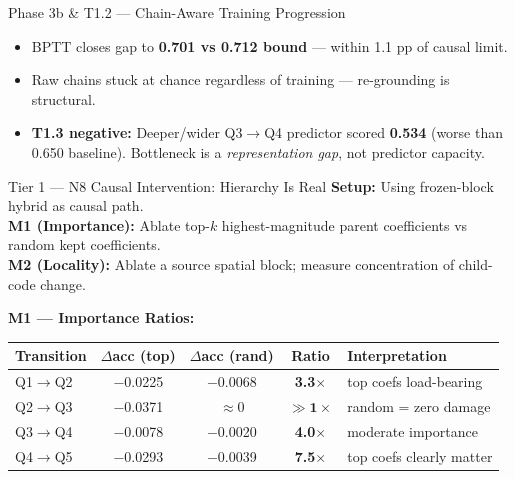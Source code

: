 \documentclass[final]{beamer}
\newlength{\colwidth}
\begin{document}
\begin{frame}[t]
\begin{columns}[t]
\begin{column}{\colwidth}
\begin{block}{Phase 3b \& T1.2 --- Chain-Aware Training Progression}
\begin{itemize}[leftmargin=1.5em, itemsep=1pt]
  \item BPTT closes gap to \textbf{0.701 vs 0.712 bound} --- within 1.1 pp of causal limit.
  \item Raw chains stuck at chance regardless of training --- re-grounding is structural.
  \item \textbf{T1.3 negative:} Deeper/wider Q3$\to$Q4 predictor scored \textbf{0.534} (worse than 0.650 baseline). Bottleneck is a \emph{representation gap}, not predictor capacity.
\end{itemize}
\end{block}

\vspace{0.5em}

\begin{block}{Tier 1 --- N8 Causal Intervention: Hierarchy Is Real}
\small
\textbf{Setup:} Using frozen-block hybrid as causal path.\\
\textbf{M1 (Importance):} Ablate top-$k$ highest-magnitude parent coefficients vs random kept coefficients.\\
\textbf{M2 (Locality):} Ablate a source spatial block; measure concentration of child-code change.

\vspace{0.4em}
\textbf{M1 --- Importance Ratios:}
\begin{center}
\begin{tabular}{@{}lcccl@{}}
\toprule
\textbf{Transition} & \textbf{$\Delta$acc (top)} & \textbf{$\Delta$acc (rand)} & \textbf{Ratio} & \textbf{Interpretation} \\
\midrule
Q1$\to$Q2 & $-$0.0225 & $-$0.0068 & \textbf{3.3$\times$} & top coefs load-bearing \\
Q2$\to$Q3 & $-$0.0371 & $\approx$0 & $\mathbf{\gg\!1\times}$ & random = zero damage \\
Q3$\to$Q4 & $-$0.0078 & $-$0.0020 & \textbf{4.0$\times$} & moderate importance \\
Q4$\to$Q5 & $-$0.0293 & $-$0.0039 & \textbf{7.5$\times$} & top coefs clearly matter \\
\bottomrule
\end{tabular}
\end{center}


\end{block}
\end{column}
\end{columns}
\end{frame}
\end{document}
